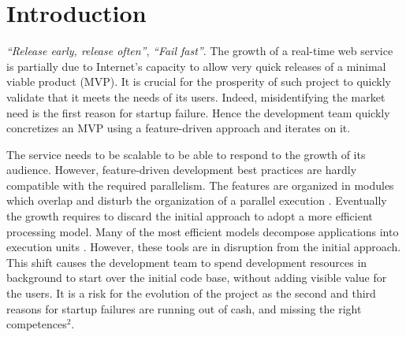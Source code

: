 \section{Introduction}

\textit{``Release early, release often''}, \textit{``Fail fast''}.
The growth of a real-time web service is partially due to Internet's capacity to allow very quick releases of a minimal viable product (MVP).
It is crucial for the prosperity of such project to quickly validate that it meets the needs of its users.
Indeed, misidentifying the market need is the first reason for startup failure.
Hence the development team quickly concretizes an MVP using a feature-driven approach and iterates on it.

The service needs to be scalable to be able to respond to the growth of its audience.
However, feature-driven development best practices are hardly compatible with the required parallelism.
The features are organized in modules which overlap and disturb the organization of a parallel execution \cite{Clements2013a,Hughes1989,Parnas1972}.
Eventually the growth requires to discard the initial approach to adopt a more efficient processing model.
Many of the most efficient models decompose applications into execution units \cite{Fox1997, Welsh2000, Dean2008}.
However, these tools are in disruption from the initial approach.
This shift causes the development team to spend development resources in background to start over the initial code base, without adding visible value for the users.
It is a risk for the evolution of the project as the second and third reasons for startup failures are running out of cash, and missing the right competences$^2$.

